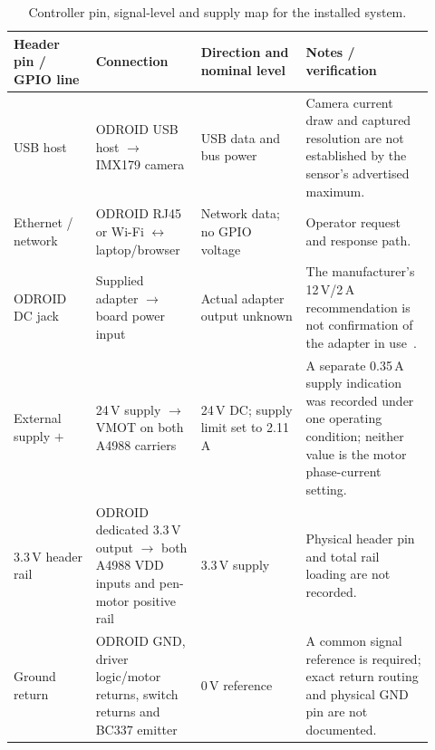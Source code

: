 \begin{table}[H]\centering\small
\setlength{\tabcolsep}{3pt}\renewcommand{\arraystretch}{1.03}
\begin{tabular}{p{0.18\linewidth}p{0.22\linewidth}p{0.23\linewidth}p{0.29\linewidth}}\toprule
\textbf{Header pin / GPIO line} & \textbf{Connection} & \textbf{Direction and nominal level} & \textbf{Notes / verification}\\\midrule
USB host & ODROID USB host $\rightarrow$ IMX179 camera & USB data and bus power & Camera current draw and captured resolution are not established by the sensor's advertised maximum.\\
Ethernet / network & ODROID RJ45 or Wi-Fi $\leftrightarrow$ laptop/browser & Network data; no GPIO voltage & Operator request and response path.\\
ODROID DC jack & Supplied adapter $\rightarrow$ board power input & Actual adapter output unknown & The manufacturer's 12\,V/2\,A recommendation is not confirmation of the adapter in use~\cite{odroidn2ds}.\\
External supply $+$ & 24\,V supply $\rightarrow$ VMOT on both A4988 carriers & 24\,V DC; supply limit set to 2.11\,A & A separate 0.35\,A supply indication was recorded under one operating condition; neither value is the motor phase-current setting.\\
3.3\,V header rail & ODROID dedicated 3.3\,V output $\rightarrow$ both A4988 VDD inputs and pen-motor positive rail & 3.3\,V supply & Physical header pin and total rail loading are not recorded.\\
Ground return & ODROID GND, driver logic/motor returns, switch returns and BC337 emitter & 0\,V reference & A common signal reference is required; exact return routing and physical GND pin are not documented.\\
\bottomrule\end{tabular}
\caption{Controller pin, signal-level and supply map for the installed system.}\label{tab:des-pin-map}
\end{table}

